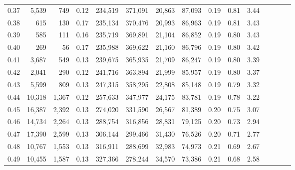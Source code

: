 \begin{tabular}{rrrcrrrrrrrrrrr}
0.37 &   5,539 &    749 &                                       0.12 &  234,519 &  371,091 &   20,863 &   87,093 &  0.19 &  0.81 &                         3.44 \\
0.38 &     615 &    130 &                                       0.17 &  235,134 &  370,476 &   20,993 &   86,963 &  0.19 &  0.81 &                         3.43 \\
0.39 &     585 &    111 &                                       0.16 &  235,719 &  369,891 &   21,104 &   86,852 &  0.19 &  0.80 &                         3.43 \\
0.40 &     269 &     56 &                                       0.17 &  235,988 &  369,622 &   21,160 &   86,796 &  0.19 &  0.80 &                         3.42 \\
0.41 &   3,687 &    549 &                                       0.13 &  239,675 &  365,935 &   21,709 &   86,247 &  0.19 &  0.80 &                         3.39 \\
0.42 &   2,041 &    290 &                                       0.12 &  241,716 &  363,894 &   21,999 &   85,957 &  0.19 &  0.80 &                         3.37 \\
0.43 &   5,599 &    809 &                                       0.13 &  247,315 &  358,295 &   22,808 &   85,148 &  0.19 &  0.79 &                         3.32 \\
0.44 &  10,318 &  1,367 &                                       0.12 &  257,633 &  347,977 &   24,175 &   83,781 &  0.19 &  0.78 &                         3.22 \\
0.45 &  16,387 &  2,392 &                                       0.13 &  274,020 &  331,590 &   26,567 &   81,389 &  0.20 &  0.75 &                         3.07 \\
0.46 &  14,734 &  2,264 &                                       0.13 &  288,754 &  316,856 &   28,831 &   79,125 &  0.20 &  0.73 &                         2.94 \\
0.47 &  17,390 &  2,599 &                                       0.13 &  306,144 &  299,466 &   31,430 &   76,526 &  0.20 &  0.71 &                         2.77 \\
0.48 &  10,767 &  1,553 &                                       0.13 &  316,911 &  288,699 &   32,983 &   74,973 &  0.21 &  0.69 &                         2.67 \\
0.49 &  10,455 &  1,587 &                                       0.13 &  327,366 &  278,244 &   34,570 &   73,386 &  0.21 &  0.68 &                         2.58 \\

\end{tabular}
